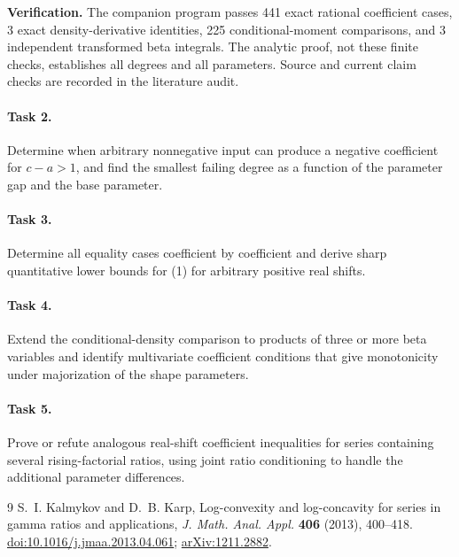 \documentclass[10pt]{article}
\begin{document}
\noindent\textbf{Verification.}
The companion program passes 441 exact rational coefficient cases,
3 exact density-derivative identities, 225 conditional-moment
comparisons, and 3 independent transformed beta integrals. The analytic
proof, not these finite checks, establishes all degrees and all parameters.
Source and current claim checks are recorded in the literature audit.

\paragraph{Task 2.}
Determine when arbitrary nonnegative input can produce a negative
coefficient for \(c-a>1\), and find the smallest failing degree
as a function of the parameter gap and the base parameter.

\paragraph{Task 3.}
Determine all equality cases coefficient by coefficient and derive
sharp quantitative lower bounds for (1) for arbitrary positive real shifts.

\paragraph{Task 4.}
Extend the conditional-density comparison to products of three or more
beta variables and identify multivariate coefficient conditions that
give monotonicity under majorization of the shape parameters.

\paragraph{Task 5.}
Prove or refute analogous real-shift coefficient inequalities for
series containing several rising-factorial ratios, using joint
ratio conditioning to handle the additional parameter differences.

\begin{thebibliography}{9}
S.~I. Kalmykov and D.~B. Karp,
Log-convexity and log-concavity for series in gamma ratios and applications,
\emph{J. Math. Anal. Appl.} \textbf{406} (2013), 400--418.
\href{https://doi.org/10.1016/j.jmaa.2013.04.061}{doi:10.1016/j.jmaa.2013.04.061};
\href{https://arxiv.org/abs/1211.2882}{arXiv:1211.2882}.
\end{thebibliography}
\end{document}
